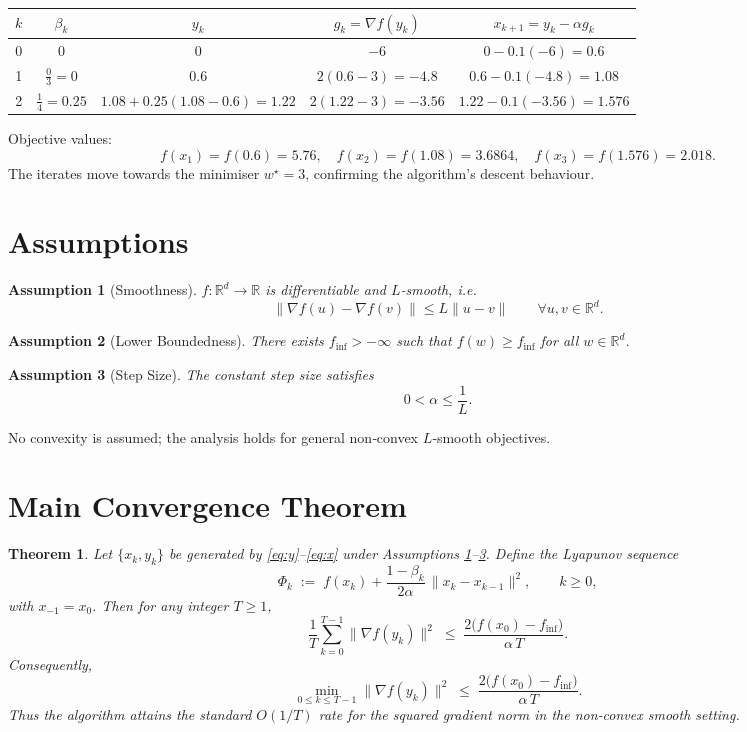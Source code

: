 \documentclass{article}
\newcommand{\R}{\mathbb{R}}
\newtheorem{theorem}{Theorem}
\newtheorem{assumption}{Assumption}
\begin{document}
\begin{center}
\begin{tabular}{c|c|c|c|c}
$k$ & $\beta_k$ & $y_k$ & $g_k=\nabla f(y_k)$ & $x_{k+1}=y_k-\alpha g_k$\\ \hline
0 & $0$ & $0$ & $-6$ & $0-0.1(-6)=0.6$\\
1 & $\frac{0}{3}=0$ & $0.6$ & $2(0.6-3)=-4.8$ & $0.6-0.1(-4.8)=1.08$\\
2 & $\frac{1}{4}=0.25$ & $1.08+0.25(1.08-0.6)=1.22$ & $2(1.22-3)=-3.56$ & $1.22-0.1(-3.56)=1.576$
\end{tabular}
\end{center}
Objective values:
\[
f(x_1)=f(0.6)=5.76,\quad f(x_2)=f(1.08)=3.6864,\quad f(x_3)=f(1.576)=2.018.
\]
The iterates move towards the minimiser $w^\star=3$, confirming the algorithm’s descent behaviour.

\newpage
\section*{Assumptions}
\begin{assumption}[Smoothness]\label{ass:smooth}
$f:\R^d\rightarrow\R$ is differentiable and $L$‑smooth, i.e.
\[
\|\nabla f(u)-\nabla f(v)\|\le L\|u-v\|\qquad\forall u,v\in\R^d.
\]
\end{assumption}
\begin{assumption}[Lower Boundedness]\label{ass:lb}
There exists $f_{\inf}>-\infty$ such that $f(w)\ge f_{\inf}$ for all $w\in\R^d$.
\end{assumption}
\begin{assumption}[Step Size]\label{ass:step}
The constant step size satisfies 
\[
0<\alpha\le\frac{1}{L}.
\]
\end{assumption}
No convexity is assumed; the analysis holds for general non‑convex $L$‑smooth objectives.

\section*{Main Convergence Theorem}
\begin{theorem}\label{thm:main}
Let $\{x_k,y_k\}$ be generated by \eqref{eq:y}–\eqref{eq:x} under Assumptions \ref{ass:smooth}–\ref{ass:step}. Define the Lyapunov sequence
\[
\Phi_k \;:=\; f(x_k) + \frac{1-\beta_k}{2\alpha}\,\|x_k-x_{k-1}\|^{2},\qquad k\ge 0,
\]
with $x_{-1}=x_0$. Then for any integer $T\ge 1$,
\[
\frac{1}{T}\sum_{k=0}^{T-1}\bigl\|\nabla f(y_k)\bigr\|^{2}
\;\le\;
\frac{2\bigl(f(x_0)-f_{\inf}\bigr)}{\alpha\,T}.
\tag{A}
\]
Consequently,
\[
\min_{0\le k\le T-1}\bigl\|\nabla f(y_k)\bigr\|^{2}
\;\le\;
\frac{2\bigl(f(x_0)-f_{\inf}\bigr)}{\alpha\,T}.
\tag{B}
\]
Thus the algorithm attains the standard $O(1/T)$ rate for the squared gradient norm in the non‑convex smooth setting. 
\end{theorem}
\end{document}
